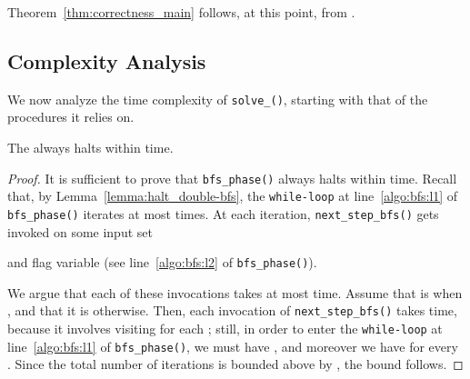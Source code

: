 \noindent Theorem~\ref{thm:correctness_main} follows, at this point,
from .

\subsection{Complexity Analysis}\label{subsect:complexity}

We now analyze the time complexity of \texttt{solve\_\mainproblem()}, starting with that of the procedures it relies on.

\begin{lemma}\label{lemma:complexity_double-bfs_phase}
The  always halts within  time.
\end{lemma}
\begin{proof}
It is sufficient to prove that \texttt{bfs\_phase()} always halts within  time.
Recall that, by Lemma~\ref{lemma:halt_double-bfs}, the \texttt{while-loop} at line~\ref{algo:bfs:l1} of \texttt{bfs\_phase()}
iterates at most  times. At each iteration,
\texttt{next\_step\_bfs()} gets invoked on some input set

and flag variable  (see line~\ref{algo:bfs:l2} of \texttt{bfs\_phase()}).


We argue that each of these invocations takes at most  time.
Assume that  is  when ,
and that it is  otherwise.
Then, each invocation of \texttt{next\_step\_bfs()} takes 
time,
because it involves visiting  for each ;
still, in order to enter the \texttt{while-loop} at line~\ref{algo:bfs:l1} of \texttt{bfs\_phase()},
we must have ,
and moreover we have  for every .
Since the total number of iterations is bounded above by , the bound follows.
\end{proof}

